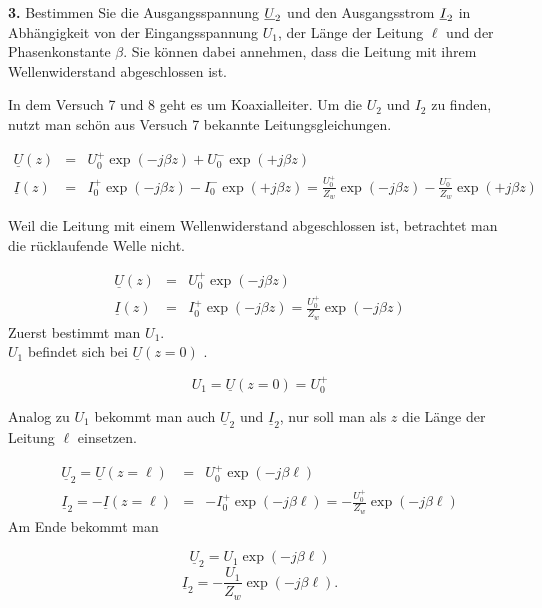 \documentclass[Protokollheft.tex]{subfiles}
\begin{document}
\begin{framed}
	\noindent \textbf{3.} Bestimmen Sie die Ausgangsspannung $\underline{U}_2$ und den Ausgangsstrom $\underline{I}_2$ in Abhängigkeit von der Eingangsspannung $U_1$, der Länge der Leitung $\ell$ und der Phasenkonstante $\beta$. Sie können dabei annehmen, dass die Leitung mit ihrem Wellenwiderstand abgeschlossen ist.\label{exer:calcU2I2}
\end{framed}
In dem Versuch 7 und 8 geht es um Koaxialleiter. Um die $U_2$ und $I_2$ zu finden, nutzt man schön aus Versuch 7 bekannte Leitungsgleichungen.

\begin{eqnarray}
\underline{U}(z)&=&U^{+}_0\exp(-j\beta z)+U^{-}_0\exp(+j\beta z)\\
\underline{I}(z)&=&I^{+}_0\exp(-j\beta z)-I^{-}_0\exp(+j\beta z)=\frac{U^{+}_0}{Z_w}\exp(-j\beta z)-\frac{U^{-}_0}{Z_w}\exp(+j\beta z)
\end{eqnarray}

Weil die Leitung mit einem Wellenwiderstand abgeschlossen ist, betrachtet man die rücklaufende Welle nicht.

\begin{eqnarray}
\underline{U}(z)&=&U^{+}_0\exp(-j\beta z)\\
\underline{I}(z)&=&I^{+}_0\exp(-j\beta z)=\frac{U^{+}_0}{Z_w}\exp(-j\beta z)
\end{eqnarray}
Zuerst bestimmt man $U_1$.\\
 $U_1$ befindet sich bei $\underline{U}(z=0)$ . 

$$U_1=\underline{U}(z=0)=U^{+}_0 $$

Analog zu $U_1$ bekommt man auch $\underline{U}_2$ und $\underline{I}_2 $, nur soll man als $z$ die Länge der Leitung $\ell$ einsetzen. 

\begin{eqnarray}
\underline{U}_2=\underline{U}(z=\ell)&=&U^{+}_0\exp(-j\beta \ell)\\
\underline{I}_2=-\underline{I}(z=\ell)&=&-I^{+}_0\exp(-j\beta \ell)=-\frac{U^{+}_0}{Z_w}\exp(-j\beta \ell)
\end{eqnarray}
Am Ende bekommt man

$$\underline{U}_2=U_1\exp(-j\beta \ell)$$
$$\underline{I}_2=-\frac{U_1}{Z_w}\exp(-j\beta \ell). $$
\end{document}
